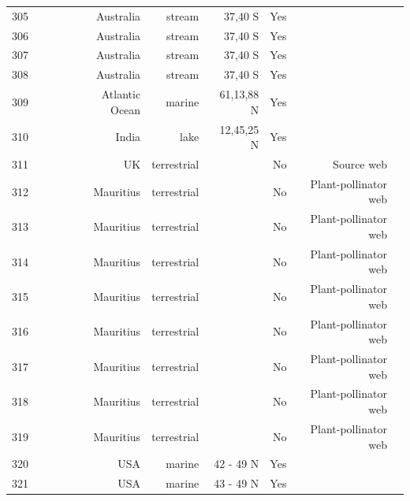\documentclass[12pt]{article}
\begin{document}
\begin{landscape}
\begin{table}[h!]
\begin{tabular}{rrrrrrrrr}
      305   & ~\citet{GlobalWeb} & ~\citet{Closs1994} & Australia & stream & 37,40 S & Yes   &       &  \\
      306   & ~\citet{GlobalWeb} & ~\citet{Closs1994} & Australia & stream & 37,40 S & Yes   &       &  \\
      307   & ~\citet{GlobalWeb} & ~\citet{Closs1994} & Australia & stream & 37,40 S & Yes   &       &  \\
      308   & ~\citet{GlobalWeb} & ~\citet{Closs1994} & Australia & stream & 37,40 S & Yes   &       &  \\
      309   & ~\citet{GlobalWeb} & ~\citet{Gontikaki2011} & Atlantic Ocean & marine & 61,13,88 N & Yes   &       &  \\
      310   & ~\citet{GlobalWeb} & ~\citet{Khan2009} & India & lake  & 12,45,25 N & Yes   &       &  \\
      311   & ~\citet{GlobalWeb} & ~\citet{Memmott2000} & UK    & terrestrial &       & No    & Source web &  \\
      312   & ~\citet{GlobalWeb} & ~\citet{Kaiser-Bunbury2009} & Mauritius & terrestrial &       & No    & Plant-pollinator web &  \\
      313   & ~\citet{GlobalWeb} & ~\citet{Kaiser-Bunbury2009} & Mauritius & terrestrial &       & No    & Plant-pollinator web &  \\
      314   & ~\citet{GlobalWeb} & ~\citet{Kaiser-Bunbury2011} & Mauritius & terrestrial &       & No    & Plant-pollinator web &  \\
      315   & ~\citet{GlobalWeb} & ~\citet{Kaiser-Bunbury2011} & Mauritius & terrestrial &       & No    & Plant-pollinator web &  \\
      316   & ~\citet{GlobalWeb} & ~\citet{Kaiser-Bunbury2011} & Mauritius & terrestrial &       & No    & Plant-pollinator web &  \\
      317   & ~\citet{GlobalWeb} & ~\citet{Kaiser-Bunbury2011} & Mauritius & terrestrial &       & No    & Plant-pollinator web &  \\
      318   & ~\citet{GlobalWeb} & ~\citet{Kaiser-Bunbury2011} & Mauritius & terrestrial &       & No    & Plant-pollinator web &  \\
      319   & ~\citet{GlobalWeb} & ~\citet{Kaiser-Bunbury2011} & Mauritius & terrestrial &       & No    & Plant-pollinator web &  \\
      320   & ~\citet{GlobalWeb} & ~\citet{Ruzicka2012} & USA   & marine & 42 - 49 N & Yes   &       &  \\
      321   & ~\citet{GlobalWeb} & ~\citet{Ruzicka2012} & USA   & marine & 43 - 49 N & Yes   &       &  \\

\end{tabular}
\end{table}
\end{landscape}
\end{document}
